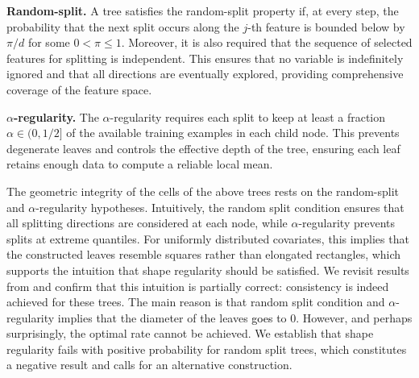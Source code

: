 \documentclass[paper=a4, fontsize=11pt]{scrartcl}
\newcommand{\rev}[1]{\textcolor{black}{#1}}
\begin{document}
 

 \noindent \textbf{Random-split.} A tree satisfies the {random-split} property if, at every step, the probability that the next split occurs along the $j$-th feature is bounded below by $\pi/d$ for some $0 < \pi \leq 1$. Moreover, it is also required that the sequence of selected features for splitting is independent. This ensures that no variable is indefinitely ignored and that all directions are eventually explored, providing comprehensive coverage of the feature space. 

 \noindent \textbf{$\alpha$-regularity.} The {$\alpha$-regularity} requires each split to keep at least a fraction $\alpha \in (0,1/2]$ of the available training examples in each child node. This prevents degenerate leaves and controls the effective depth of the tree, ensuring each leaf retains enough data to compute a reliable local mean. 


The geometric integrity of the cells of the above trees rests on the random-split and $\alpha$-regularity hypotheses.
Intuitively, the random split condition ensures that all splitting directions are considered at each node, while $\alpha$-regularity prevents splits at extreme quantiles. For uniformly distributed covariates, this implies that the constructed leaves resemble squares rather than elongated rectangles, which supports the intuition that shape regularity should be satisfied. We revisit results from \cite{biau2012analysis,wager2018estimation,duroux2018impact} and confirm that this intuition is partially correct: consistency is indeed achieved for these trees. The main reason is that random split condition and
$\alpha$-regularity implies that the diameter of the leaves \rev{goes} to $0$. However, and perhaps surprisingly, the optimal rate cannot be achieved. We establish that shape regularity fails with positive probability for random split trees, which constitutes a negative result and calls for an alternative construction. 
\end{document}
